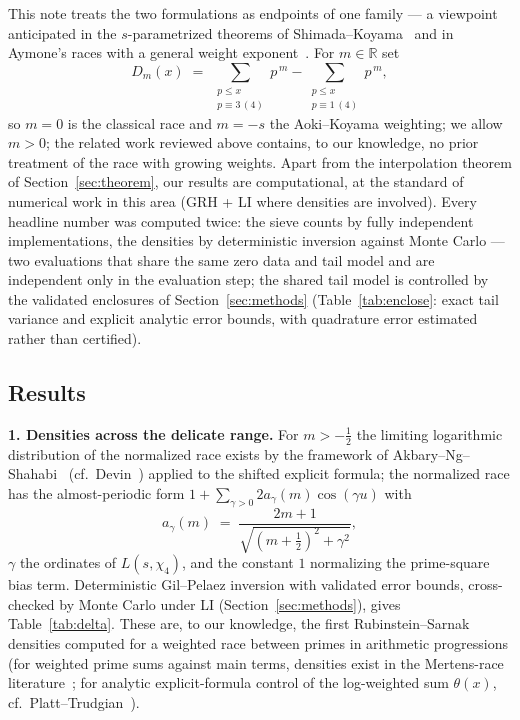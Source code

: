 \documentclass[11pt]{article}
\begin{document}
This note treats the two formulations as endpoints of one family ---
a viewpoint anticipated in the $s$-parametrized theorems of
Shimada--Koyama~\cite{SK25} and in Aymone's races with a general weight
exponent~\cite{Aym22}. For $m\in\mathbb R$ set
\[
D_m(x)\;=\;\sum_{\substack{p\le x\\ p\equiv 3\,(4)}}p^{\,m}
-\sum_{\substack{p\le x\\ p\equiv 1\,(4)}}p^{\,m},
\]
so $m=0$ is the classical race and $m=-s$ the Aoki--Koyama weighting;
we allow $m>0$; the related work reviewed above contains, to our
knowledge, no prior treatment of the race with growing weights. Apart from
the interpolation theorem of Section~\ref{sec:theorem}, our results are
computational, at the standard of numerical work in this area
(GRH + LI where densities are involved). Every headline number was
computed twice: the sieve counts by fully independent implementations,
the densities by deterministic inversion against Monte Carlo --- two
evaluations that share the same zero data and tail model and are
independent only in the evaluation step; the shared tail model is
controlled by the validated enclosures of
Section~\ref{sec:methods} (Table~\ref{tab:enclose}: exact tail
variance and explicit analytic error bounds, with quadrature error
estimated rather than certified).

\subsection*{Results}

\textbf{1. Densities across the delicate range.} For $m>-\tfrac12$ the
limiting logarithmic distribution of the normalized race exists by the
framework of Akbary--Ng--Shahabi~\cite{ANS14} (cf.\ Devin~\cite{Dev20})
applied to the shifted explicit formula; the normalized race has the
almost-periodic form $1+\sum_{\gamma>0}2a_\gamma(m)\cos(\gamma u)$ with
\[
a_\gamma(m)\;=\;\frac{2m+1}{\sqrt{(m+\tfrac12)^2+\gamma^2}},
\]
$\gamma$ the ordinates of $L(s,\chi_4)$, and the constant $1$
normalizing the prime-square bias term. Deterministic Gil--Pelaez
inversion with validated error bounds, cross-checked by Monte Carlo
under LI (Section~\ref{sec:methods}), gives Table~\ref{tab:delta}.
These are,
to our knowledge, the first Rubinstein--Sarnak densities computed for a
weighted race between primes in arithmetic progressions (for weighted
prime sums against main terms, densities exist in the Mertens-race
literature~\cite{Lam16}; for analytic explicit-formula control of the
log-weighted sum $\theta(x)$, cf.\ Platt--Trudgian~\cite{PT14}).
\end{document}
